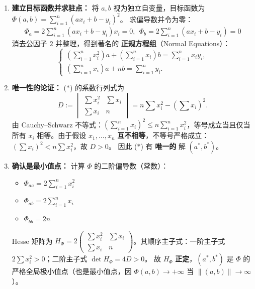 \documentclass[lang=cn,11pt]{elegantbook}
\begin{document}
\begin{solution}
\begin{enumerate}
  \item \textbf{建立目标函数并求驻点：}
  将 $a,b$ 视为独立自变量，目标函数为 $\Phi(a,b)=\sum_{i=1}^{n}(ax_i+b-y_i)^2$。
  求偏导数并令为零：
  \begin{align*}
\Phi_a = 2\sum_{i=1}^{n}(ax_i+b-y_i)x_i=0, ~~\Phi_b = 2\sum_{i=1}^{n}(ax_i+b-y_i)=0
  \end{align*}
  消去公因子 $2$ 并整理，得到著名的 \textbf{正规方程组}（Normal Equations）：
  \[
  \begin{cases}
  \displaystyle\left(\sum_{i=1}^{n}x_i^2\right)a + \left(\sum_{i=1}^{n}x_i\right)b = \sum_{i=1}^{n}x_iy_i,\\[10pt]
  \displaystyle\left(\sum_{i=1}^{n}x_i\right)a + nb = \sum_{i=1}^{n}y_i.
  \end{cases}
  \tag{$\ast$}
  \]

  \item \textbf{唯一性的论证：}
  ($\ast$) 的系数行列式为
  \[
  D:=
  \begin{vmatrix}
  \sum x_i^2 & \sum x_i\\
  \sum x_i & n
  \end{vmatrix}
  =n\sum x_i^2-\left(\sum x_i\right)^{\!2}.
  \]
  由 Cauchy--Schwarz 不等式：$\left(\sum_{i=1}^n x_i\right)^2 \leq n\sum_{i=1}^n x_i^2$，等号成立当且仅当所有 $x_i$ 相等。由于假设 $x_1,\dots,x_n$ \textbf{互不相等}，不等号严格成立：$\left(\sum x_i\right)^2 < n\sum x_i^2$，故 $D>0$。
  因此 ($\ast$) 有 \textbf{唯一的} 解 $(a^*,b^*)$。

  \item \textbf{确认是最小值点：}
  计算 $\Phi$ 的二阶偏导数（常数）：
  \begin{itemize}
    \item $\Phi_{aa}=2\sum_{i=1}^{n}x_i^2$
    \item $\Phi_{ab}=2\sum_{i=1}^{n}x_i$
    \item $\Phi_{bb}=2n$
  \end{itemize}
  Hesse 矩阵为 $H_\Phi=2\begin{pmatrix} \sum x_i^2 & \sum x_i \\ \sum x_i & n \end{pmatrix}$。其顺序主子式：一阶主子式 $2\sum x_i^2>0$；二阶主子式 $\det H_\Phi=4D>0$。
  故 $H_\Phi$ \textbf{正定}，$(a^*,b^*)$ 是 $\Phi$ 的严格全局极小值点（也是最小值点，因 $\Phi(a,b)\to+\infty$ 当 $\|(a,b)\|\to\infty$）。


\end{enumerate}
\end{solution}
\end{document}
